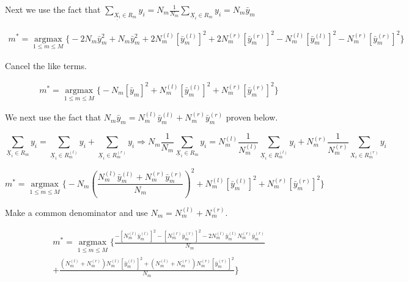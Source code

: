 \documentclass[11pt]{article}
\begin{document}
Next we use the fact that 
$\sum_{\underline{X_i} \in R_m} y_i = N_m\frac{1}{N_m} \sum_{\underline{X}_i \in R_m}y_i = N_m \bar{y}_m$

\begin{equation}
\begin{split}
m^* = \underset{1 \leq m \leq M}{\operatorname{argmax}} \Bigg\{-2N_m\bar{y}_m^2 +N_m\bar{y}_m^2 + 2N_m^{(l)}[\bar{y}_m^{(l)}]^2 + 2N_m^{(r)}[\bar{y}_m^{(r)}]^2  -N_m^{(l)}[\bar{y}_m^{(l)}]^2 -N_m^{(r)}[\bar{y}_m^{(r)}]^2\Bigg\}
\end{split}
\end{equation}

Cancel the like terms. 

\begin {equation}
\begin{split}
m^* = \underset{1 \leq m \leq M}{\operatorname{argmax}} \Bigg\{-N_m[\bar{y}_m]^2 + N_m^{(l)}[\bar{y}_m^{(l)}]^2 +N_m^{(r)}[\bar{y}_m^{(r)}]^2\Bigg\}
\end{split}
\end{equation}

We next use the fact that $N_m\bar{y}_m = N_m^{(l)}\bar{y}_m^{(l)} + N_m^{(r)}\bar{y}_m^{(r)}$ proven below.

$$ \sum_{\underline{X}_i \in R_m} y_i = \sum_{\underline{X}_i \in R_m^{(l)}}y_i + \sum_{\underline{X}_i \in R_m^{(r)}} y_i \Rightarrow N_m \frac{1}{N_m} \sum_{\underline{X}_i \in R_m}y_i = N_m^{(l)}\frac{1}{N_m^{(l)}} \sum_{\underline{X}_i \in R_m^{(l)}}y_i + N_m^{(r)}\frac{1}{N_m^{(r)}}\sum_{X_i \in R_m^{(r)}}y_i $$

\begin {equation}
m^* = \underset{1 \leq m \leq M}{\operatorname{argmax}} \Bigg\{ -N_m ( \frac{N_m^{(l)}\bar{y}_m^{(l)} + N_m^{(r)}\bar{y}_m^{(r)}}{N_m})^2 + N_m^{(l)}[\bar{y}_m^{(l)}]^2 + N_m^{(r)}[\bar{y}_m^{(r)}]^2\Bigg\}
\end{equation}

Make a common denominator and use $N_m = N_m^{(l)} + N_m^{(r)}$.

\begin {equation}
\begin{split}
m^* = \underset{1 \leq m \leq M}{\operatorname{argmax}} \Bigg\{\frac{-[N_m^{(l)}\bar{y}_m^{(l)}]^2 - [N_m^{(r)}\bar{y}_m^{(r)}]^2-2N_m^{(l)}\bar{y}_m^{(l)}N_m^{(r)}\bar{y}_m^{(r)}}{N_m}\\ + \frac{(N_m^{(l)}+ N_m^{(r)})N_m^{(l)}[\bar{y}_m^{(l)}]^2 + (N_m^{(l)}+N_m^{(r)})N_m^{(r)}[\bar{y}_m^{(r)}]^2}{N_m}\Bigg\}
\end{split}
\end{equation}
\end{document}
